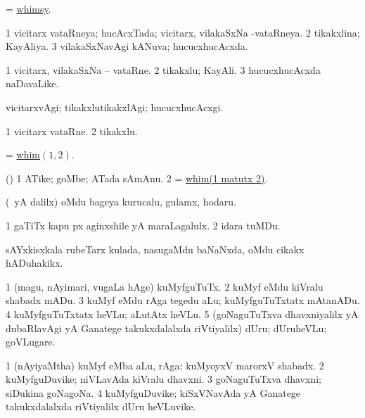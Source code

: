 \bentry
{} 
\gl{\nA}
\bmng
= \hyperlink{whimsy}{whimsy}. 
\emng
\eentry

\bentry
{} 
\gl{\gu}
\expl{}
\bmng
\bnum
\num{1} vicitarx vataRneya; hucAcxTada; vicitarx, vilakaSxNa -vataRneya. 
\num{2} tikakxlina; KayAliya. 
\num{3} vilakaSxNavAgi kANuva; hucucxhucAcxda. 
\enum
\emng
\eentry

\bentry
{} 
\gl{\nA}
\expl{}
\bmng
\bnum
\num{1} vicitarx, vilakaSxNa -- vataRne. 
\num{2} tikakxlu; KayAli. 
\num{3} hucucxhucAcxda naDavaLike. 
\enum
\emng
\eentry

\bentry
{} 
\gl{\kirxvi}
\expl{}
\bmng
vicitarxvAgi; tikakxlutikakxlAgi; hucucxhucAcxgi. 
\emng
\eentry

\bentry
{} 
\gl{\nA}
\expl{}
\bmng
\bnum
\num{1} vicitarx vataRne. 
\num{2} tikakxlu. 
\enum
\emng
\eentry

\bentry
{} 
\gl{\nA}
\bmng
= \hyperlink{whim}{whim\((1, 2)\)}. 
\emng
\eentry

\bentry
{} 
\gl{\nA}
\expl{}
\bmng
(\pArxparx) 
\bnum
\num{1} ATike; goMbe; ATada sAmAnu. 
\num{2} = \hyperlink{whim}{whim(1 matutx 2)}. 
\enum
\emng
\eentry

\bentry
{} 
\gl{\nA}
\expl{}
\bmng
(\Eva\ yA \bava dalilx) oMdu bageya kurucalu, gulamx, hodaru. 
\emng
\eentry

\bentry
{} 
\gl{\nA}
\expl{}
\bmng
\bnum
\num{1} gaTiTx kapu px aginxshile yA maraLagalulx. 
\num{2} idara tuMDu. 
\enum
\emng
\eentry

{} 
\gl{\nA}
\expl{}
\bmng
sAYxkisxkala rubeTarx kulada, nasugaMdu baNaNxda, oMdu cikakx hADuhakikx. 
\emng
\eentry

\bentry
{} 
\gl{\akirx}
\expl{}
\bmng
\bnum
\num{1} (magu, nAyimari, \mo vugaLa hAge) kuMyfguTuTx. 
\num{2} kuMyf eMdu kiVralu shabadx mADu. 
\num{3} kuMyf eMdu rAga tegedu aLu; kuMyfguTuTxtatx mAtanADu. 
\num{4} kuMyfguTuTxtatx heVLu; aLutAtx heVLu. 
\num{5} (goNaguTuTxva dhavxniyalilx yA dubaRlavAgi yA Ganatege takukxdalalxda riVtiyalilx) dUru; dUruheVLu; goVLugare. 
\enum
\emng
\eentry

\bentry
{} 
\gl{\nA}
\expl{}
\bmng
\bnum
\num{1} (nAyiyaMtha) kuMyf eMba aLu, rAga; kuMyoyxV marorxV shabadx. 
\num{2} kuMyfguDuvike; niVLavAda kiVralu dhavxni. 
\num{3} goNaguTuTxva dhavxni; siDukina goNagoNa. 
\num{4} kuMyfguDuvike; kiSxVNavAda yA Ganatege takukxdalalxda riVtiyalilx dUru heVLuvike. 
\enum
\emng
\eentry

